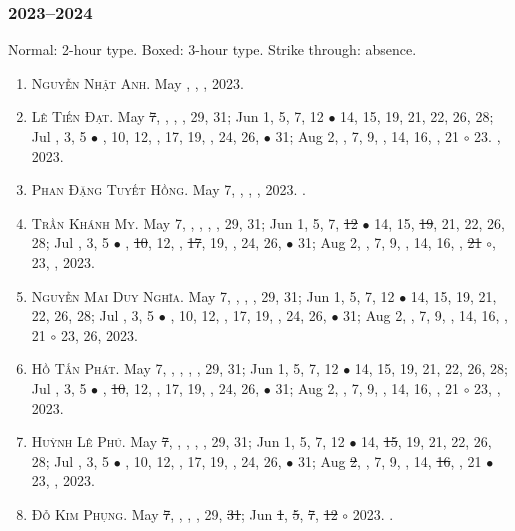 \documentclass{article}
\begin{document}
\subsubsection{2023--2024}
Normal: 2-hour type. Boxed: 3-hour type. Strike through: absence.
\begin{enumerate}
	\item \textsc{Nguyễn Nhật Anh.} {\sf[In]} May , , , 2023. {\sf[Out]}
	\item \textsc{Lê Tiến Đạt.} May \st{7}, , , , 29, 31; Jun 1, 5, 7, 12 $\bullet$ 14, 15, 19, 21, 22, 26, 28; Jul , 3, 5 $\bullet$ , 10, 12, , 17, 19, , 24, 26,  $\bullet$ 31; Aug 2, , 7, 9, , 14, 16, , 21 $\circ$ 23. , 2023.
	\item \textsc{Phan Đặng Tuyết Hồng.} May 7, , , , 2023. {}. {\sf[Out]}
	\item \textsc{Trần Khánh My.} May 7, , , , , 29, 31; Jun 1, 5, 7, \st{12} $\bullet$ 14, 15, \st{19}, 21, 22, 26, 28; Jul , 3, 5 $\bullet$ , \st{10}, 12, , \st{17}, 19, , 24, 26,  $\bullet$ 31; Aug 2, , 7, 9, , 14, 16, , \st{21} $\circ$, 23, , 2023.
	\item \textsc{Nguyễn Mai Duy Nghĩa.} May 7, , , , 29, 31; Jun 1, 5, 7, 12 $\bullet$ 14, 15, 19, 21, 22, 26, 28; Jul , 3, 5 $\bullet$ , 10, 12, , 17, 19, , 24, 26,  $\bullet$ 31; Aug 2, , 7, 9, , 14, 16, , 21 $\circ$ 23, 26, 2023.
	\item \textsc{Hồ Tấn Phát.} May 7, , , , , 29, 31; Jun 1, 5, 7, 12 $\bullet$ 14, 15, 19, 21, 22, 26, 28; Jul , 3, 5 $\bullet$ , \st{10}, 12, , 17, 19, , 24, 26,  $\bullet$ 31; Aug 2, , 7, 9, , 14, 16, , 21 $\circ$ 23, , 2023.
	\item \textsc{Huỳnh Lê Phú.} May \st{7}, , , , , 29, 31; Jun 1, 5, 7, 12 $\bullet$ 14, \st{15}, 19, 21, 22, 26, 28; Jul , 3, 5 $\bullet$ , 10, 12, , 17, 19, , 24, 26,  $\bullet$ 31; Aug \st{2}, , 7, 9, , 14, \st{16}, , 21 $\bullet$ 23, , 2023.
	\item \textsc{Đỗ Kim Phụng.} May \st{7}, , , , 29, \st{31}; Jun \st{1}, \st{5}, \st{7}, \st{12} $\circ$ 2023. {}. {\sf[Out]}

\end{enumerate}
\end{document}
